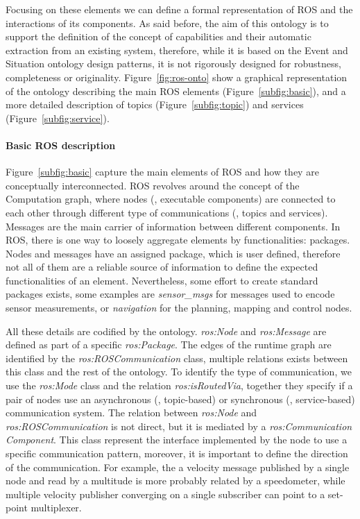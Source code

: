 Focusing on these elements we can define a formal representation of ROS and the interactions of its components. As said before, the aim of this ontology is to support the definition of the concept of capabilities and their automatic extraction from an existing system, therefore, while it is based on the Event and Situation ontology design patterns, it is not rigorously designed for robustness, completeness or originality. Figure~\ref{fig:ros-onto} show a graphical representation of the ontology describing the main ROS elements (Figure~\ref{subfig:basic}), and a more detailed description of topics (Figure~\ref{subfig:topic}) and services (Figure~\ref{subfig:service}).

\paragraph{Basic ROS description} Figure~\ref{subfig:basic} capture the main elements of ROS and how they are conceptually interconnected. ROS revolves around the concept of the Computation graph, where nodes (\ie, executable components) are connected to each other through different type of communications (\ie, topics and services). Messages are the main carrier of information between different components. In ROS, there is one way to loosely aggregate elements by functionalities: packages. Nodes and messages have an assigned package, which is user defined, therefore not all of them are a reliable source of information to define the expected functionalities of an element. Nevertheless, some effort to create standard packages exists, some examples are \textit{sensor\_msgs} for messages used to encode sensor measurements, or \textit{navigation} for the planning, mapping and control nodes.

All these details are codified by the ontology. \textit{ros:Node} and \textit{ros:Message} are defined as part of a specific \textit{ros:Package}. The edges of the runtime graph are identified by the \textit{ros:ROS\-Com\-mu\-ni\-ca\-tion} class, multiple relations exists between this class and the rest of the ontology. To identify the type of communication, we use the \textit{ros:Mode} class and the relation \textit{ros:isRoutedVia}, together they specify if a pair of nodes use an asynchronous (\ie, topic-based) or synchronous (\ie, service-based) communication system. The relation between \textit{ros:Node} and \textit{ros:ROS\-Com\-mu\-ni\-ca\-tion} is not direct, but it is mediated by a \textit{ros:Communication Component}. This class represent the interface implemented by the node to use a specific communication pattern, moreover, it is important to define the direction of the communication. For example, the a velocity message published by a single node and read by a multitude is more probably related by a speedometer, while multiple velocity publisher converging on a single subscriber can point to a set-point multiplexer.


